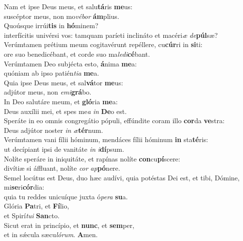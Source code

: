 \evenverse Nam et ipse Deus meus, et salu\textbf{tá}ris \textbf{me}us:~\*\\
\evenverse suscéptor meus, non mo\textit{vé}\textit{bor} \textbf{ám}plius.\\
\oddverse Quoúsque irrúi\textbf{tis} in \textbf{hó}minem?~\*\\
\oddverse interfícitis univérsi vos: tamquam paríeti inclináto et macéri\textit{æ} \textit{de}\textbf{púl}sæ?\\
\evenverse Verúmtamen prétium meum cogitavérunt repéllere, cu\textbf{cúr}ri in \textbf{si}ti:~\*\\
\evenverse ore suo benedicébant, et corde suo ma\textit{le}\textit{di}\textbf{cé}bant.\\
\oddverse Verúmtamen Deo subjécta esto, \textbf{á}nima \textbf{me}a:~\*\\
\oddverse quóniam ab ipso patién\textit{ti}\textit{a} \textbf{me}a.\\
\evenverse Quia ipse Deus meus, et sal\textbf{vá}tor \textbf{me}us:~\*\\
\evenverse adjútor meus, non \textit{e}\textit{mi}\textbf{grá}bo.\\
\oddverse In Deo salutáre meum, et \textbf{gló}ria \textbf{me}a:~\*\\
\oddverse Deus auxílii mei, et spes me\textit{a} \textit{in} \textbf{De}o est.\\
\evenverse Speráte in eo omnis congregátio pópuli, effúndite coram illo \textbf{cor}da \textbf{ve}stra:~\*\\
\evenverse Deus adjútor noster \textit{in} \textit{æ}\textbf{tér}num.\\
\oddverse Verúmtamen vani fílii hóminum, mendáces fílii hóminum \textbf{in} sta\textbf{té}ris:~\*\\
\oddverse ut decípiant ipsi de vanitáte \textit{in} \textit{i}\textbf{dí}psum.\\
\evenverse Nolíte speráre in iniquitáte, et rapínas nolíte \textbf{con}cu\textbf{pí}scere:~\*\\
\evenverse divítiæ si áffluant, nolíte \textit{cor} \textit{ap}\textbf{pó}nere.\\
\oddverse Semel locútus est Deus, duo hæc audívi, quia potéstas Dei est, et tibi, Dómine, mi\textbf{se}ri\textbf{cór}dia:~\*\\
\oddverse quia tu reddes unicuíque juxta ó\textit{pe}\textit{ra} \textbf{su}a.\\
\evenverse Glória \textbf{Pa}tri, et \textbf{Fí}lio,~\*\\
\evenverse et Spirí\textit{tu}\textit{i} \textbf{San}cto.\\
\oddverse Sicut erat in princípio, et \textbf{nunc}, et \textbf{sem}per,~\*\\
\oddverse et in sǽcula sæcu\textit{ló}\textit{rum}. \textbf{A}men.\\
